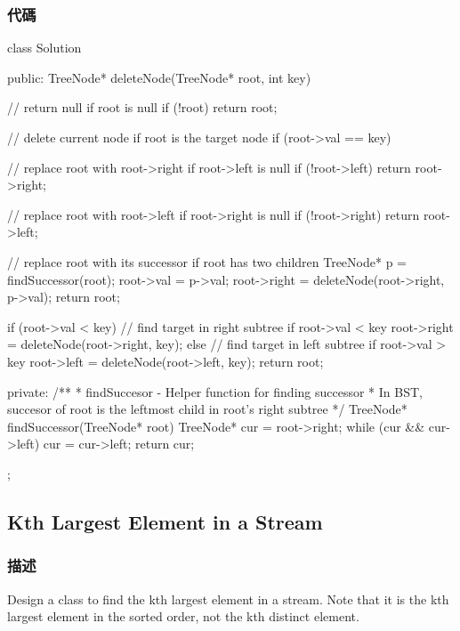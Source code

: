 \subsubsection{代碼}
\begin{Code}
class Solution {
public:
    TreeNode* deleteNode(TreeNode* root, int key) {
        // return null if root is null
        if (!root) {
            return root;
        }

        // delete current node if root is the target node
        if (root->val == key) {
            // replace root with root->right if root->left is null
            if (!root->left) {
                return root->right;
            }

            // replace root with root->left if root->right is null
            if (!root->right) {
                return root->left;
            }

            // replace root with its successor if root has two children
            TreeNode* p = findSuccessor(root);
            root->val = p->val;
            root->right = deleteNode(root->right, p->val);
            return root;
        }

        if (root->val < key) {
            // find target in right subtree if root->val < key
            root->right = deleteNode(root->right, key);
        } else {
            // find target in left subtree if root->val > key
            root->left = deleteNode(root->left, key);
        }
        return root;
    }
private:
    /**
     * findSuccesor - Helper function for finding successor
     * In BST, succesor of root is the leftmost child in root's right subtree
     */
    TreeNode* findSuccessor(TreeNode* root) {
        TreeNode* cur = root->right;
        while (cur && cur->left) {
            cur = cur->left;
        }
        return cur;
    }
};
\end{Code}

\subsection{Kth Largest Element in a Stream}
\label{sec:kth-largest-element-in-a-stream}

\subsubsection{描述}
Design a class to find the kth largest element in a stream. Note that it is the kth largest element in the sorted order, not the kth distinct element.

